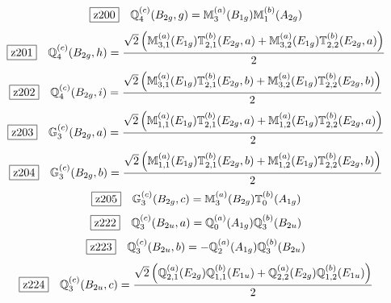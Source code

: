\documentclass[fleqn,10pt,landscape]{jsarticle}
\begin{document}
\begin{dmath*}
\hspace*{3mm}\fbox{z200}\quad \mathbb{Q}_{4}^{(c)}(B_{2g},g)=\mathbb{M}_{3}^{(a)}(B_{1g}) \mathbb{M}_{1}^{(b)}(A_{2g})
\end{dmath*}
\begin{dmath*}
\hspace*{3mm}\fbox{z201}\quad \mathbb{Q}_{4}^{(c)}(B_{2g},h)=\frac{\sqrt{2} \left(\mathbb{M}_{3,1}^{(a)}(E_{1g}) \mathbb{T}_{2,1}^{(b)}(E_{2g},a) + \mathbb{M}_{3,2}^{(a)}(E_{1g}) \mathbb{T}_{2,2}^{(b)}(E_{2g},a)\right)}{2}
\end{dmath*}
\begin{dmath*}
\hspace*{3mm}\fbox{z202}\quad \mathbb{Q}_{4}^{(c)}(B_{2g},i)=\frac{\sqrt{2} \left(\mathbb{M}_{3,1}^{(a)}(E_{1g}) \mathbb{T}_{2,1}^{(b)}(E_{2g},b) + \mathbb{M}_{3,2}^{(a)}(E_{1g}) \mathbb{T}_{2,2}^{(b)}(E_{2g},b)\right)}{2}
\end{dmath*}
\begin{dmath*}
\hspace*{3mm}\fbox{z203}\quad \mathbb{G}_{3}^{(c)}(B_{2g},a)=\frac{\sqrt{2} \left(\mathbb{M}_{1,1}^{(a)}(E_{1g}) \mathbb{T}_{2,1}^{(b)}(E_{2g},a) + \mathbb{M}_{1,2}^{(a)}(E_{1g}) \mathbb{T}_{2,2}^{(b)}(E_{2g},a)\right)}{2}
\end{dmath*}
\begin{dmath*}
\hspace*{3mm}\fbox{z204}\quad \mathbb{G}_{3}^{(c)}(B_{2g},b)=\frac{\sqrt{2} \left(\mathbb{M}_{1,1}^{(a)}(E_{1g}) \mathbb{T}_{2,1}^{(b)}(E_{2g},b) + \mathbb{M}_{1,2}^{(a)}(E_{1g}) \mathbb{T}_{2,2}^{(b)}(E_{2g},b)\right)}{2}
\end{dmath*}
\begin{dmath*}
\hspace*{3mm}\fbox{z205}\quad \mathbb{G}_{3}^{(c)}(B_{2g},c)=\mathbb{M}_{3}^{(a)}(B_{2g}) \mathbb{T}_{0}^{(b)}(A_{1g})
\end{dmath*}
\begin{dmath*}
\hspace*{3mm}\fbox{z222}\quad \mathbb{Q}_{3}^{(c)}(B_{2u},a)=\mathbb{Q}_{0}^{(a)}(A_{1g}) \mathbb{Q}_{3}^{(b)}(B_{2u})
\end{dmath*}
\begin{dmath*}
\hspace*{3mm}\fbox{z223}\quad \mathbb{Q}_{3}^{(c)}(B_{2u},b)=- \mathbb{Q}_{2}^{(a)}(A_{1g}) \mathbb{Q}_{3}^{(b)}(B_{2u})
\end{dmath*}
\begin{dmath*}
\hspace*{3mm}\fbox{z224}\quad \mathbb{Q}_{3}^{(c)}(B_{2u},c)=\frac{\sqrt{2} \left(\mathbb{Q}_{2,1}^{(a)}(E_{2g}) \mathbb{Q}_{1,1}^{(b)}(E_{1u}) + \mathbb{Q}_{2,2}^{(a)}(E_{2g}) \mathbb{Q}_{1,2}^{(b)}(E_{1u})\right)}{2}
\end{dmath*}
\end{document}
